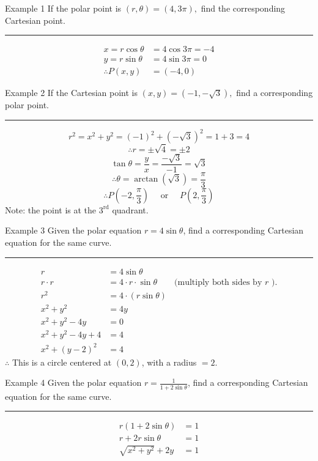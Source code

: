 \documentclass[12pt,a4paper]{article}
\begin{document}
\begin{eg}{Example 1}
	If the polar point is $(r,\theta)=(4,3\pi),$ find the corresponding Cartesian point.\\
	\noindent\rule[0.25\baselineskip]{\textwidth}{1pt}
	\[\begin{aligned}
		x=r\cos\theta &=4\cos{3\pi}=-4\\
		y=r\sin\theta &=4\sin{3\pi}=0\\
		\therefore P(x,y)&=(-4,0)
	\end{aligned}\]
\end{eg}
\begin{eg}{Example 2}
	If the Cartesian point is $(x,y)=(-1,-\sqrt{3}),$ find a corresponding polar point. \\
	\noindent\rule[0.25\baselineskip]{\textwidth}{1pt}
	\[r^2=x^2+y^2=(-1)^2+(-\sqrt{3})^2=1+3=4\]
	\[\therefore r=\pm\sqrt{4}=\pm2\]
	\[\tan\theta=\frac{y}{x}=\frac{-\sqrt{3}}{-1}=\sqrt{3}\]
	\[\therefore\theta=\arctan(\sqrt{3})=\frac{\pi}{3}\]
	\[\therefore P\left(-2,\frac{\pi}{3}\right)\quad\text{ or }\quad P\left(2,\frac{\pi}{3}\right)\]
	Note: the point is at the $3^\text{rd}$ quadrant. 
\end{eg}
\begin{eg}{Example 3}
	Given the polar equation $r=4\sin\theta$, find a corresponding Cartesian equation for the same curve. 	\\
	\noindent\rule[0.25\baselineskip]{\textwidth}{1pt}
	\[\begin{aligned}
		r&=4\sin\theta\\
		r\cdot r&=4\cdot r\cdot\sin\theta\qquad \text{(multiply both sides by }r\text{ ).}\\
		r^2&=4\cdot(r\sin\theta)\\
		x^2+y^2&=4y\\
		x^2+y^2-4y&=0\\
		x^2+y^2-4y+4&=4\\
		x^2+(y-2)^2&=4
	\end{aligned}\]
	$\therefore$ This is a circle centered at $(0,2)$, with a radius $=2$.
\end{eg}
\begin{eg}{Example 4}
	Given the polar equation $\displaystyle r=\frac{1}{1+2\sin\theta}$, find a corresponding Cartesian equation for the same curve. 	\\
	\noindent\rule[0.25\baselineskip]{\textwidth}{1pt}
	\[\begin{aligned}
		r(1+2\sin\theta)&=1\\
		r+2r\sin\theta &=1\\
		\sqrt{x^2+y^2}+2y&=1
	\end{aligned}\]
\end{eg}
\end{document}

